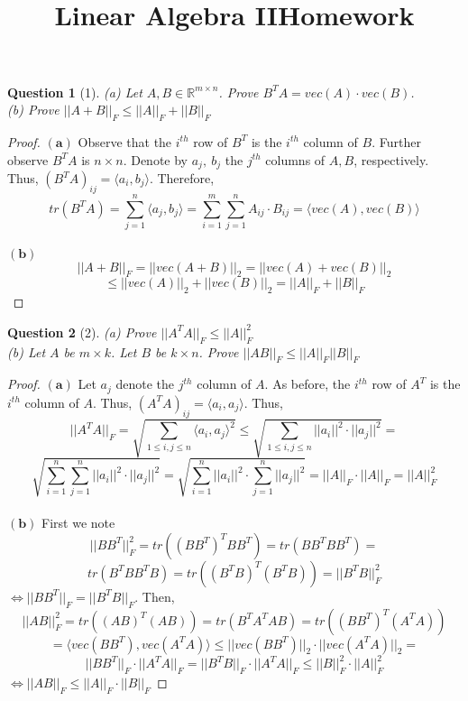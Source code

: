 \documentclass[11pt]{article}
\title{\vspace{-50pt}
\Huge \name
\\\vspace{20pt}
\huge Linear Algebra II\hfill Homework \hw}
\author{}
\date{}
\theoremstyle{quest}
\newtheorem*{question}{Question}
\begin{document}
\maketitle

\begin{question}[1]
(a) Let $A, B \in \mathbb{R}^{m \times n}$. Prove $B^TA = vec(A) \cdot vec(B)$.
\\(b) Prove $||A + B||_F \le ||A||_F + ||B||_F$
\end{question}
\begin{proof}
$\mathbf{(a)}$ Observe that the $i^{th}$ row of $B^T$ is the $i^{th}$ column of $B$. Further observe $B^TA$ is $n \times n$. Denote by $a_j,\ b_j$ the $j^{th}$ columns of $A, B$, respectively.
\\Thus, $(B^TA)_{i j} = \langle a_i, b_j \rangle$. Therefore,
$$tr(B^TA) = \sum_{j=1}^n \langle a_j, b_j \rangle = \sum_{i=1}^m \sum_{j=1}^n A_{i j} \cdot B_{i j} = \langle vec(A), vec(B)\rangle$$
\\$\mathbf{(b)}$
$$||A+B||_F = ||vec(A+B)||_2 = ||vec(A) + vec(B)||_2$$ $$\le ||vec(A)||_2 + ||vec(B)||_2 = ||A||_F + ||B||_F$$
\end{proof}
\begin{question}[2]
(a) Prove $||A^TA||_F \le ||A||_F^2$
\\(b) Let $A$ be $m \times k$. Let $B$ be $k \times n$. Prove $||AB||_F \le ||A||_F||B||_F$
\end{question}
\begin{proof}
$\mathbf{(a)}$ Let $a_j$ denote the $j^{th}$ column of $A$. As before, the $i^{th}$ row of $A^T$ is the $i^{th}$ column of $A$. Thus, $(A^TA)_{i j} = \langle a_i, a_j \rangle$. Thus,
$$||A^TA||_F = \sqrt{\sum_{1 \le i,j \le n} \langle a_i, a_j \rangle^2} \le \sqrt{\sum_{1 \le i,j \le n} ||a_i||^2 \cdot ||a_j||^2} = $$ $$\sqrt{\sum_{i=1}^n \sum_{j=1}^n ||a_i||^2 \cdot ||a_j||^2} = \sqrt{\sum_{i=1}^n ||a_i||^2 \cdot \sum_{j=1}^n  ||a_j||^2} = ||A||_F \cdot ||A||_F = ||A||_F^2$$
\\$\mathbf{(b)}$ First we note
$$||BB^T||_F^2 = tr((BB^T)^TBB^T) = tr(BB^TBB^T) =$$
$$tr(B^TBB^TB) = tr((B^TB)^T(B^TB)) = ||B^TB||_F^2$$
$\iff ||BB^T||_F = ||B^TB||_F$. Then,
$$||AB||_F^2 = tr((AB)^T(AB)) = tr(B^T A^T A B) = tr((BB^T)^T(A^TA))$$
$$= \langle vec(BB^T), vec(A^TA) \rangle \le ||vec(BB^T)||_2 \cdot ||vec(A^TA)||_2 = $$
$$||BB^T||_F \cdot ||A^TA||_F = ||B^TB||_F \cdot ||A^TA||_F \le ||B||_F^2 \cdot ||A||_F^2$$
$\iff ||AB||_F \le ||A||_F \cdot ||B||_F$
\end{proof}
\end{document}
